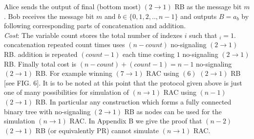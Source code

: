 Alice sends the output of final (bottom most) $(2\rightarrow1)$ RB as the message bit $m$.
Bob receives the message bit $m$ and $b\in\{0,1,2,..,n-1\}$ and outputs $B=a_b$ by following corresponding parts of concatenation and addition. \\
\textit{Cost}: The variable count stores the total number of indexes $i$ such that $_i=1$. concatenation repeated count times uses $(n-count)$ no-signaling $(2\rightarrow1)$ RB. addition is repeated $(count-1)$ each time costing $1$ no-signaling $(2\rightarrow1)$ RB. Finally total cost is $(n-count)+(count-1)=n-1$ no-signaling $(2\rightarrow1)$ RB.
For example winning $(7\rightarrow 1)$ RAC using $(6)$ $(2\rightarrow 1)$ RB [see FIG. 6].
It is to be noted at this point that the protocol given above is just one of many possibilities for simulation of $(n\rightarrow 1)$ RAC using $(n-1)$ $(2\rightarrow 1)$ RB. In particular any construction which forms a fully connected binary tree with no-signaling $(2\rightarrow 1)$ RB as nodes can be used for the simulation $(n\rightarrow 1)$ RAC. In Appendix B we give the proof that $(n-2)$ $(2\rightarrow 1)$ RB (or equivalently PR) cannot simulate $(n\rightarrow 1)$ RAC.  

